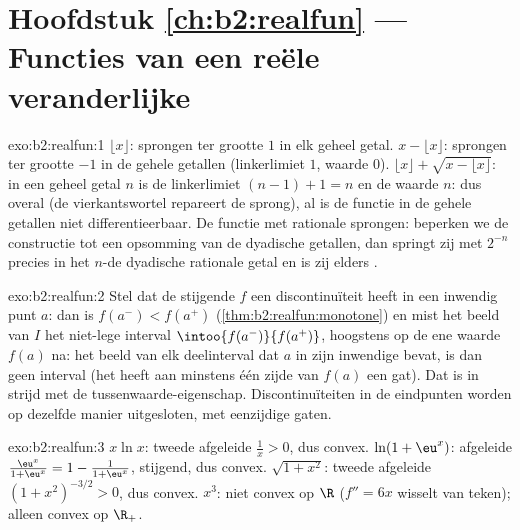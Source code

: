 \section*{Hoofdstuk \ref{ch:b2:realfun} --- Functies van een reële veranderlijke}

\begin{solution}{exo:b2:realfun:1}
$\lfloor x\rfloor$: sprongen ter grootte $1$ in elk geheel getal.
$x - \lfloor x\rfloor$: sprongen ter grootte $-1$ in de gehele
getallen (linkerlimiet $1$, waarde $0$). $\lfloor x\rfloor +
\sqrt{x - \lfloor x\rfloor}$: in een geheel getal $n$ is de
linkerlimiet $(n - 1) + 1 = n$ en de waarde $n$: dus overal
\emph{} (de vierkantswortel repareert de sprong), al is de
functie in de gehele getallen niet differentieerbaar. De functie
met rationale sprongen: beperken we de constructie tot een
opsomming van de dyadische getallen, dan springt zij met $2^{-n}$
precies in het $n$-de dyadische rationale getal en is zij elders
.
\end{solution}

\begin{solution}{exo:b2:realfun:2}
Stel dat de stijgende $f$ een discontinuïteit heeft in een inwendig
punt $a$: dan is $f(a^-) < f(a^+)$
(\cref{thm:b2:realfun:monotone}) en mist het beeld van $I$ het
niet-lege  interval $\intoo{f(a^-)}{f(a^+)}$, hoogstens op de
ene waarde $f(a)$ na: het beeld van elk deelinterval dat $a$ in
zijn inwendige bevat, is dan geen interval (het heeft aan minstens
één zijde van $f(a)$ een gat). Dat is in strijd met de
tussenwaarde-eigenschap. Discontinuïteiten in de eindpunten worden
op dezelfde manier uitgesloten, met eenzijdige gaten.
\end{solution}

\begin{solution}{exo:b2:realfun:3}
$x\ln x$: tweede afgeleide $\frac1x > 0$, dus convex. $\ln(1 +
\eu^x)$: afgeleide $\frac{\eu^x}{1 + \eu^x} = 1 - \frac{1}{1 +
\eu^x}$, stijgend, dus convex. $\sqrt{1 + x^2}$: tweede afgeleide
$(1 + x^2)^{-3/2} > 0$, dus convex. $x^3$: niet convex op $\R$
($f'' = 6x$ wisselt van teken); alleen convex op $\R_+$.
\end{solution}

